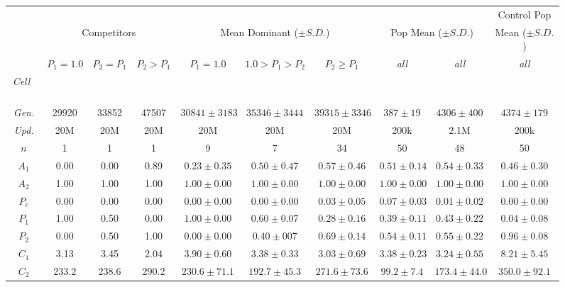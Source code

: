 \begin{figure*}%

\begin{center}
\setlength\tabcolsep{1.5pt} %
\begin{tabular}{ | c || c c c | c c c | c c | c | }
  \multicolumn{9}{c}{} & \multicolumn{1}{c}{Control Pop} \\
  \multicolumn{1}{c}{} & \multicolumn{3}{c}{Competitors} & \multicolumn{3}{c}{Mean Dominant ($\pm S.D.$)} & \multicolumn{2}{c}{Pop Mean ($\pm S.D.$)} & \multicolumn{1}{c}{Mean ($\pm S.D.$)} \\
 \cline{2-10}
  \multicolumn{1}{c|}{} & \tiny{$P_{1} = 1.0$} & \tiny{$P_{2} = P_{1}$} & \tiny{$P_{2} > P_{1}$} & \tiny{$P_{1} = 1.0$} & \tiny{$1.0 > P_{1} > P_{2}$} & \tiny{$P_{2} \geq P_{1}$} & \tiny{\textit{all}} & \tiny{\textit{all}} & \tiny{\textit{all}}  \\
 \hline
 \vspace{-1ex}
 \textit{Cell~~} & & & & & & & & & \\
 \textit{Gen.} & 29920 & 33852 & 47507 & $30841 \pm 3183$ & $35346 \pm 3444$ & $39315 \pm 3346$ & $387 \pm 19$ & $4306 \pm 400$  & $4374 \pm 179$ \\
 \textit{Upd.} & 20M & 20M & 20M & 20M & 20M & 20M & 200k & 2.1M & 200k \\
 $n$ & 1 & 1 & 1 & 9 & 7 & 34 & 50 & 48 & 50 \\
 \hhline{|=||===|===|==|=|}
 $A_1$ & 0.00 & 0.00 & 0.89 & $0.23 \pm 0.35$ & $0.50 \pm 0.47$ & $0.57 \pm 0.46$ & $0.51 \pm 0.14$ & $0.54 \pm 0.33$ & $0.46 \pm 0.30$\\
 $A_2$ & 1.00 & 1.00 & 1.00 & $1.00 \pm 0.00$ & $1.00 \pm 0.00$ & $1.00 \pm 0.00$ & $1.00 \pm 0.00$ & $1.00 \pm 0.00$ & $1.00 \pm 0.00$ \\
 \hline
 $P_{c}$ & 0.00 & 0.00 & 0.00 & $0.00 \pm 0.00$ & $0.00 \pm 0.00$ & $0.03 \pm 0.05$ & $0.07 \pm 0.03$ & $0.01 \pm 0.02$ & $0.00 \pm 0.00$ \\
 $P_1$ & 1.00 & 0.50 & 0.00 & $1.00 \pm 0.00$ & $0.60 \pm 0.07$ & $0.28 \pm 0.16$ & $0.39 \pm 0.11$ & $0.43 \pm 0.22$ & $0.04 \pm 0.08$ \\
 $P_2$ & 0.00 & 0.50 & 1.00 & $0.00 \pm 0.00$ & $0.40 \pm 007$ & $0.69 \pm 0.14$ & $0.54 \pm 0.11$ & $0.55 \pm 0.22$ & $0.96 \pm 0.08$ \\
 \hline
 $C_1$ & 3.13 & 3.45 & 2.04 & $3.90 \pm 0.60$ & $3.38 \pm 0.33$ & $3.03 \pm 0.69$ & $3.38 \pm 0.23$ & $3.24 \pm 0.55$ & $8.21 \pm 5.45$ \\
 $C_2$ & 233.2 & 238.6 & 290.2 & $230.6 \pm 71.1$ & $192.7 \pm 45.3$ & $271.6 \pm 73.6$ & $99.2 \pm 7.4$ & $173.4 \pm 44.0$ & $350.0 \pm 92.1$ \\

\end{tabular}
\end{center}
\end{figure*}
